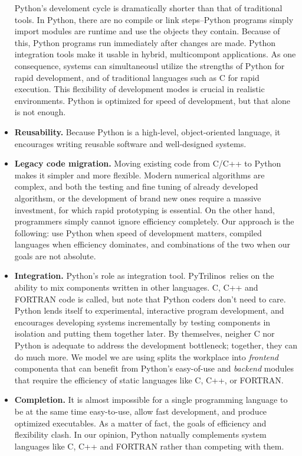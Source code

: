 \documentclass[10pt,relax]{SANDreport}
\newcommand{\PyTrilinos}{{PyTrilinos}}
\begin{document}
\begin{itemize}
  Python's
  develoment cycle is dramatically shorter than that of traditional tools. In
  Python, there are no compile or link steps--Python programs simply import
  modules are runtime and use the objects they contain. Because of this,
Python programs run immediately after changes are made. Python integration
  tools make it usable in hybrid, multicompont applications. As one
  consequence, systems can simultaneousl utilize the strengths of Python for
  rapid development, and of traditional languages such as C for rapid
  execution.
  This flexibility of development modes is crucial in realistic environments.
  Python is optimized for speed of development, but that alone is not enough.
%
\item {\bf Reusability.} Because Python is a high-level, object-oriented
language, it encourages writing reusable software and well-designed systems.
%
\item {\bf Legacy code migration.} Moving existing code from C/C++ to Python
makes it simpler and more flexible.
Modern numerical
algorithms are complex, and both the testing and fine tuning of already
developed algorithsm, or the development of brand new ones require a massive
investment, for which rapid prototyping is essential. On the other hand,
programmers simply cannot ignore efficiency completely. Our approach is the
following: use Python when speed of development matters, compiled languages
when efficiency dominates, and combinations of the two when our goals are
not absolute.
%
\item {\bf Integration.} Python's role as integration tool. \PyTrilinos\ relies
on the ability to mix components written in other languages. C, C++ and
FORTRAN code is called, but note that Python coders don't need to care.
  Python lends itself to experimental, interactive program development, and
  encourages developing systems incrementally by testing components in
  isolation and putting them together later.
  By themselves, neigher C nor Python is adequate to address the development
  bottleneck; together, they can do much more. We model we are using splits
  the workplace into {\sl frontend} componenta that can benefit from Python's
  easy-of-use and {\sl backend} modules that require the efficiency of static
  languages like C, C++, or FORTRAN.
%
\item {\bf Completion.} It is almost impossible for a single
programming language to be at the same time easy-to-use, allow fast
development, and produce optimized executables. As a matter of fact, the
goals of efficiency and flexibility clash. 
In our opinion, Python natually complements system
languages like C, C++ and FORTRAN rather than competing with them.
\end{itemize}
\end{document}
